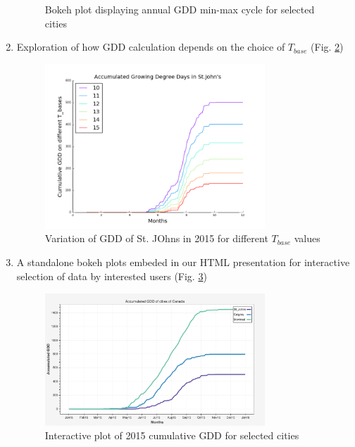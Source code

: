 \documentclass{article}
\begin{document}
\begin{enumerate}
\begin{center}
\begin{figure}[!h]
\caption{Bokeh plot displaying annual GDD min-max cycle for selected cities}
\label{bokeh_min-max}
\end{figure}
\end{center}
\item Exploration of how GDD calculation depends on the choice of $T_{base}$ (Fig. \ref{gdd_diff-tbase})
\begin{center}
\begin{figure}[!htb]
\includegraphics[width=3.25in]{./source/Report/op3.png}
\caption{Variation of GDD of St. JOhns in 2015 for different $T_{base}$ values}
\label{gdd_diff-tbase}
\end{figure}
\end{center}

\item A standalone bokeh plots embeded in our HTML presentation for interactive selection of data by interested users (Fig. \ref{gdd_interactive})
\begin{center}
\begin{figure}[!h]
\includegraphics[width=3.25in]{./source/Report/op-task_4.png}
\caption{Interactive plot of 2015 cumulative GDD for selected cities}
\label{gdd_interactive}
\end{figure}
\end{center}


\end{enumerate}
\end{document}
